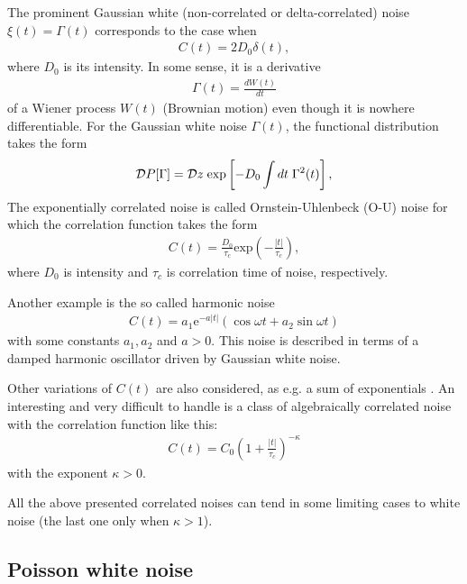\documentclass[authoryear,draft,1p,times]{elsarticle}
\renewcommand{\=}{\stackrel{\mathrm{d}}{=}}
\begin{document}
The prominent  Gaussian  white  (non-correlated or delta-correlated) noise $\xi(t)=\Gamma(t)$ 
corresponds to the case when 
%
\begin{eqnarray}
\label{whi}
C(t)=  2D_0 \delta (t),  
\end{eqnarray} 
%
where $D_0$ is its intensity. In some sense, it is a derivative 
%
\begin{eqnarray}
\label{wien}
\Gamma(t)= \frac{dW(t)}{dt}  
\end{eqnarray} 
%
of a Wiener process  $W(t)$ (Brownian motion)  even though it  is nowhere differentiable.  
For the  Gaussian white noise $\Gamma(t)$, the functional distribution takes the form 
%
\begin{eqnarray}
\label{whiteG}
{\cal D}P[\Gamma] = {\cal D}z \; {\mbox{exp}}\left[-D_0  \int dt\; 
\Gamma^2(t)  \right],
\end{eqnarray} 
%
The exponentially correlated noise is called Ornstein-Uhlenbeck (O-U) 
 noise  \cite{ornst} for which  the correlation function takes the form 
%
\begin{eqnarray}
\label{ornst}
C(t)=   \frac{D_0}{\tau_c} \mbox{exp}\left( -\frac{|t|}{\tau_c}\right), 
\end{eqnarray} 
%
where $D_0$ is  intensity and $\tau_c$ is  correlation time of noise, respectively. 

Another example is the so called  harmonic noise \cite{lutz} 
%
\begin{eqnarray}
\label{harm}
C(t)=  a_1 \mbox{e}^{-a|t|} \left(\cos \omega t + a_2 \sin \omega t\right)
\end{eqnarray} 
%
with some constants $a_1, a_2$ and $a>0$.  This noise is described in terms of a damped harmonic oscillator 
driven by Gaussian white noise. 

Other variations of $C(t)$ are also considered, as e.g.  
a sum of  exponentials \cite{kupfer,bao}. An interesting and very  difficult to handle is a 
class of  algebraically correlated noise with the correlation function like this:  
%
\begin{eqnarray}
\label{algeb}
C(t)=   C_0 \left(1+ \frac{|t|}{\tau_c}\right)^{-\kappa}  
\end{eqnarray} 
%
with the exponent $\kappa >0$. 

All the above presented correlated noises can tend in some limiting cases 
to white noise (the last one only when $\kappa > 1$). 

\subsection{Poisson white noise} 
\end{document}
